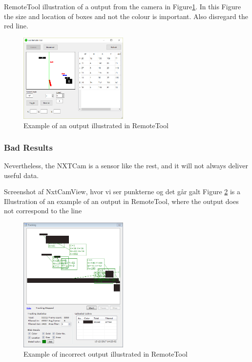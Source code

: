 RemoteTool illustration of a output from the camera in Figure\ref{fig:RemoteToolOutput1}. In this Figure the size and location of boxes and not the colour is important. Also disregard the red line.
\begin{figure}[H]
    \centering
    \includegraphics[width=0.48\textwidth]{Images/Analysis/NXTCamTesting/BusRemoteTool_Good.png}
    \caption{Example of an output illustrated in RemoteTool}
    \label{fig:RemoteToolOutput1}
\end{figure}




\subsubsection{Bad Results}
Nevertheless, the NXTCam is a sensor like the rest, and it will not always deliver useful data. 

Screenshot af NxtCamView, hvor vi ser punkterne og det går galt
Figure \ref{fig:RemoteToolOutput2} is a Illustration of an example of an output in RemoteTool, where the output does not correspond to the line 
\begin{figure}[H]
    \centering
    \includegraphics[width=0.48\textwidth]{Images/Analysis/NXTCamTesting/NXTCamView_Boxes_2.png}
    \caption{Example of incorrect output illustrated in RemoteTool}
    \label{fig:RemoteToolOutput2}
\end{figure}



